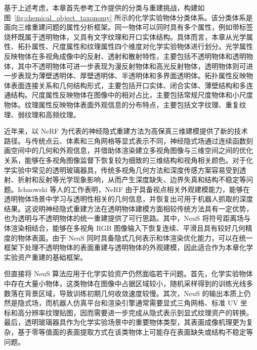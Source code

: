 基于上述考虑，本章首先参考工作\cite{verbin2022refnerf,zhang2024alphaneus,sajjan2019cleargrasp,kazhdan2006poisson,fang2022transcg,wu2025alphasurf,hollein2023text2room,schonberger2016sfm,xu2020marmvs}提供的分类与重建挑战，构建如图~\ref{fig:chemical_object_taxonomy} 所示的化学实验物体分类体系。该分类体系是面向三维重建问题的属性分析框架。同一物体可以同时具有多个属性，例如带标签烧杯既属于透明物体，又具有文字纹理和开口实体结构。具体而言，本章从光学属性、拓扑属性、尺度属性和纹理属性四个维度对化学实验物体进行划分。光学属性反映物体在多视角成像中的反射、透射和散射特性，主要包括不透明物体和透明物体，其中不透明物体可进一步表现为漫反射物体和高光反射物体，透明物体则可进一步表现为薄壁透明体、厚壁透明体、半透明体和多界面透明体。拓扑属性反映物体表面连接关系和几何结构形式，主要包括开口实体、闭合实体、薄壁结构和多连通结构。尺度属性反映物体在图像中的相对占比，主要包括常规尺度物体和小尺度物体。纹理属性反映物体表面外观信息的分布特点，主要包括文字纹理、重复纹理、弱纹理和高频纹理。

近年来，以 NeRF 为代表的神经隐式重建方法为高保真三维建模提供了新的技术路径。与传统点云、体素和三角网格等显式表示不同，神经隐式场通过连续函数刻画空间中的几何和外观信息，并借助体渲染建立多视角图像与三维空间之间的优化关系，能够在多视角图像监督下恢复较为细致的三维结构和视角相关颜色。对于化学实验中常见的透明玻璃器具，传统多视角几何方法和深度传感方案容易受到透射、折射和反射等光学现象影响，从而产生深度缺失、边界失真和结构不稳定等问题。Ichnowski 等人的工作\cite{ichnowski2022dexnerf}表明，NeRF 由于具备视点相关外观建模能力，能够在透明物体场景中学习与透明性相关的几何信息，并恢复出可用于机器人抓取的深度结果。这说明神经隐式重建方法在透明物体建模方面相较传统方法具有一定优势，也为透明与不透明物体的统一重建提供了可行思路。其中，NeuS\cite{wang2021neus} 将符号距离场与体渲染相结合，能够在多视角 RGB 图像输入下恢复连续、平滑且具有较好几何精度的物体表面。由于 NeuS 同时具备隐式几何表示和体渲染优化能力，可以在统一框架下处理不透明物体的表面重建与透明物体的外观建模，因此适合作为本章化学实验资产重建的基础框架。

但直接将 NeuS 算法应用于化学实验资产仍然面临若干问题。首先，化学实验物体中存在大量小物体，这类物体在图像中占据区域较小，随机采样得到的训练光线多数落在背景区域，导致训练初期几何收敛速度较慢。其次，NeuS 的输出本质上仍然是隐式场，而机器人仿真平台和渲染引擎通常需要显式三角网格、标准 UV 坐标和高分辨率纹理贴图，因而需要进一步完成从隐式表示到显式纹理资产的转换。最后，透明玻璃器具作为化学实验场景中的重要物体类型，其表面成像机理更为复杂，基于零等值面的表面提取方式在该类物体上可能存在表面缺失或结构不稳定等问题。

